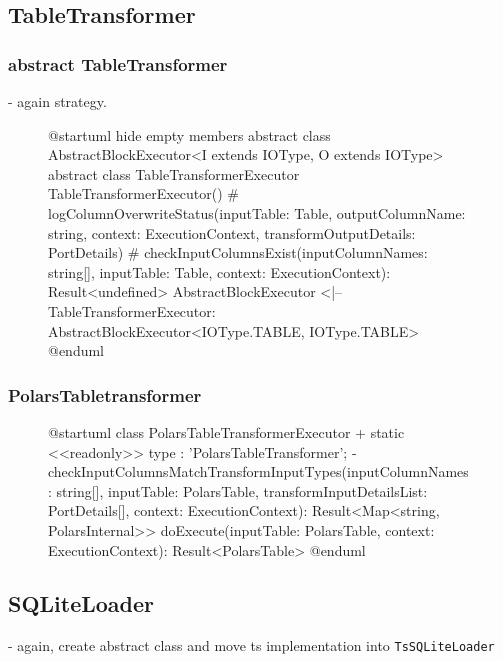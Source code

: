\subsection{TableTransformer}
\subsubsection{abstract TableTransformer}
- again strategy.
\begin{figure}
	\begin{plantuml}
		@startuml
		hide empty members
		abstract class AbstractBlockExecutor<I extends IOType, O extends IOType>
		abstract class TableTransformerExecutor {
				TableTransformerExecutor()
				# logColumnOverwriteStatus(inputTable: Table, outputColumnName: string, context: ExecutionContext, transformOutputDetails: PortDetails)
				# checkInputColumnsExist(inputColumnNames: string[], inputTable: Table, context: ExecutionContext): Result<undefined>
			}
		AbstractBlockExecutor <|-- TableTransformerExecutor: AbstractBlockExecutor<IOType.TABLE, IOType.TABLE>
		@enduml
	\end{plantuml}
	\caption{}
	\label{fig:uml:tabletransformer}
\end{figure}
\subsubsection{PolarsTabletransformer}
\begin{figure}
	\begin{plantuml}
		@startuml
		class PolarsTableTransformerExecutor  {
		+ {static} <<readonly>> type : 'PolarsTableTransformer';
		- checkInputColumnsMatchTransformInputTypes(inputColumnNames: string[], inputTable: PolarsTable, transformInputDetailsList: PortDetails[], context: ExecutionContext): Result<Map<string, PolarsInternal>>
		doExecute(inputTable: PolarsTable, context: ExecutionContext): Result<PolarsTable>
		}
		@enduml
	\end{plantuml}
	\caption{}
	\label{fig:uml:polarstabletransformer}
\end{figure}

\subsection{SQLiteLoader}
- again, create abstract class and move ts implementation into \Verb|TsSQLiteLoader|

